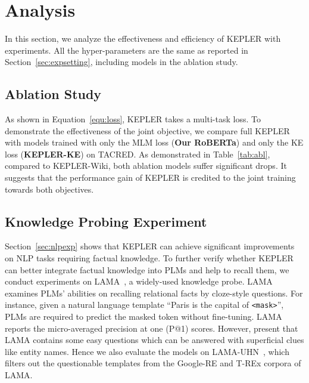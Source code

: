 \section{Analysis}
In this section, we analyze the effectiveness and efficiency of KEPLER with experiments. All the hyper-parameters are the same as reported in Section~\ref{sec:expsetting}, including models in the ablation study.

\subsection{Ablation Study}
\label{sec:ablation}
As shown in Equation~\ref{equ:loss}, KEPLER takes a multi-task loss. To demonstrate the effectiveness of the joint objective, we compare full KEPLER with models trained with only the MLM loss (\textbf{Our RoBERTa}) and only the KE loss (\textbf{KEPLER-KE}) on TACRED. As demonstrated in Table~\ref{tab:abl}, compared to KEPLER-Wiki, both ablation models suffer significant drops. It suggests that the performance gain of KEPLER is credited to the joint training towards both objectives. 



\subsection{Knowledge Probing Experiment}

Section~\ref{sec:nlpexp} shows that KEPLER can achieve significant improvements on NLP tasks requiring factual knowledge. To further verify whether KEPLER can better integrate factual knowledge into PLMs and help to recall them, we conduct experiments on LAMA~\citep{petroni2019language}, a widely-used knowledge probe. LAMA examines PLMs' abilities on recalling relational facts by cloze-style questions. For instance, given a natural language template ``Paris is the capital of \texttt{<mask>}'', PLMs are required to predict the masked token without fine-tuning. 
LAMA reports the micro-averaged precision at one (P@1) scores. However, \citet{Poerner2019EBERT} present that LAMA contains some easy questions which can be answered with superficial clues like entity names. Hence we also evaluate the models on LAMA-UHN~\citep{Poerner2019EBERT}, which filters out the questionable templates from the Google-RE and T-REx corpora of LAMA.





